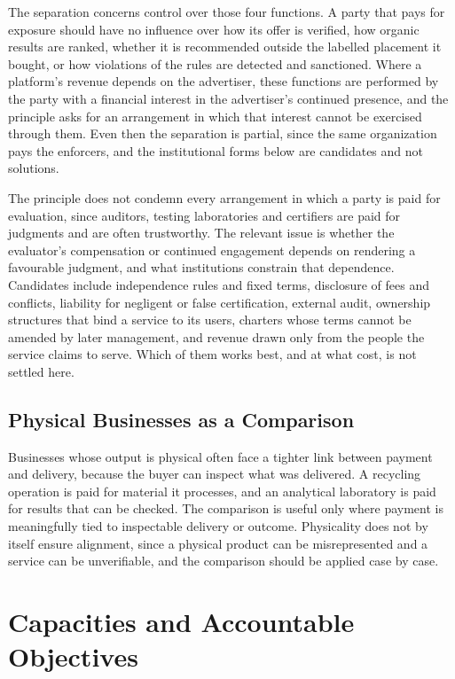 \documentclass[12pt, a4paper]{article}
\begin{document}
The separation concerns control over those four functions. A party that pays for exposure should have no influence over how its offer is verified, how organic results are ranked, whether it is recommended outside the labelled placement it bought, or how violations of the rules are detected and sanctioned. Where a platform's revenue depends on the advertiser, these functions are performed by the party with a financial interest in the advertiser's continued presence, and the principle asks for an arrangement in which that interest cannot be exercised through them. Even then the separation is partial, since the same organization pays the enforcers, and the institutional forms below are candidates and not solutions.

The principle does not condemn every arrangement in which a party is paid for evaluation, since auditors, testing laboratories and certifiers are paid for judgments and are often trustworthy. The relevant issue is whether the evaluator's compensation or continued engagement depends on rendering a favourable judgment, and what institutions constrain that dependence. Candidates include independence rules and fixed terms, disclosure of fees and conflicts, liability for negligent or false certification, external audit, ownership structures that bind a service to its users, charters whose terms cannot be amended by later management, and revenue drawn only from the people the service claims to serve. Which of them works best, and at what cost, is not settled here.

\subsection{Physical Businesses as a Comparison}

Businesses whose output is physical often face a tighter link between payment and delivery, because the buyer can inspect what was delivered. A recycling operation is paid for material it processes, and an analytical laboratory is paid for results that can be checked. The comparison is useful only where payment is meaningfully tied to inspectable delivery or outcome. Physicality does not by itself ensure alignment, since a physical product can be misrepresented and a service can be unverifiable, and the comparison should be applied case by case.

\section{Capacities and Accountable Objectives}
\label{sec:capacity}
\end{document}
